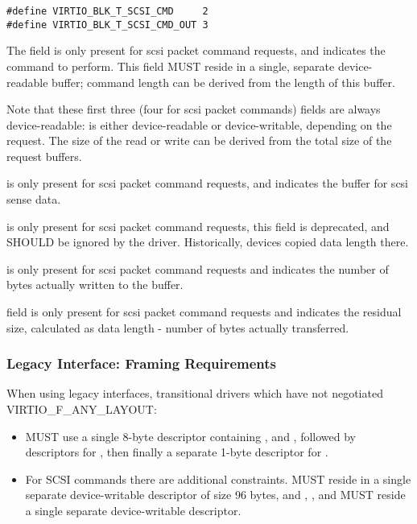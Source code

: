\begin{lstlisting}
#define VIRTIO_BLK_T_SCSI_CMD     2
#define VIRTIO_BLK_T_SCSI_CMD_OUT 3
\end{lstlisting}

The  field is only present for scsi packet command requests,
and indicates the command to perform. This field MUST reside in a
single, separate device-readable buffer; command length can be derived
from the length of this buffer.

Note that these first three (four for scsi packet commands)
fields are always device-readable:  is either device-readable
or device-writable, depending on the request. The size of the read or
write can be derived from the total size of the request buffers.

 is only present for scsi packet command requests,
and indicates the buffer for scsi sense data.

 is only present for scsi packet command
requests, this field is deprecated, and SHOULD be ignored by the
driver. Historically, devices copied data length there.

 is only present for scsi packet command
requests and indicates the number of bytes actually written to
the  buffer.

 field is only present for scsi packet command
requests and indicates the residual size, calculated as data
length - number of bytes actually transferred.

\subsubsection{Legacy Interface: Framing Requirements}\label{sec:Device Types / Block Device / Legacy Interface: Framing Requirements}

When using legacy interfaces, transitional drivers which have not
negotiated VIRTIO_F_ANY_LAYOUT:

\begin{itemize}
\item MUST use a single 8-byte descriptor containing ,
   and , followed by descriptors
  for , then finally a separate 1-byte descriptor
  for .

\item For SCSI commands there are additional constraints.
   MUST reside in a
  single separate device-writable descriptor of size 96 bytes,
  and , ,  and
   MUST reside a single separate
  device-writable descriptor.
\end{itemize}

